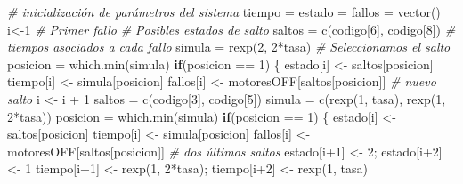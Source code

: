 \documentclass[
]{book}
\newenvironment{Shaded}{\begin{snugshade}}{\end{snugshade}}
\newcommand{\CommentTok}[1]{\textcolor[rgb]{0.56,0.35,0.01}{\textit{#1}}}
\newcommand{\ControlFlowTok}[1]{\textcolor[rgb]{0.13,0.29,0.53}{\textbf{#1}}}
\newcommand{\DecValTok}[1]{\textcolor[rgb]{0.00,0.00,0.81}{#1}}
\newcommand{\FunctionTok}[1]{\textcolor[rgb]{0.00,0.00,0.00}{#1}}
\newcommand{\NormalTok}[1]{#1}
\newcommand{\OtherTok}[1]{\textcolor[rgb]{0.56,0.35,0.01}{#1}}
\newcommand{\SpecialCharTok}[1]{\textcolor[rgb]{0.00,0.00,0.00}{#1}}
\theoremstyle{definition}
\theoremstyle{definition}
\theoremstyle{definition}
\theoremstyle{definition}
\theoremstyle{remark}
\begin{document}
\begin{Shaded}
\begin{Highlighting}[]
  \CommentTok{\# inicialización de parámetros del sistema }
\NormalTok{  tiempo }\OtherTok{=}\NormalTok{  estado }\OtherTok{=}\NormalTok{ fallos }\OtherTok{=} \FunctionTok{vector}\NormalTok{()}
\NormalTok{  i}\OtherTok{\textless{}{-}}\DecValTok{1}
  \CommentTok{\# Primer fallo}
  \CommentTok{\# Posibles estados de salto}
\NormalTok{  saltos }\OtherTok{=} \FunctionTok{c}\NormalTok{(codigo[}\DecValTok{6}\NormalTok{], codigo[}\DecValTok{8}\NormalTok{])}
  \CommentTok{\# tiempos asociados a cada fallo}
\NormalTok{  simula }\OtherTok{=} \FunctionTok{rexp}\NormalTok{(}\DecValTok{2}\NormalTok{, }\DecValTok{2}\SpecialCharTok{*}\NormalTok{tasa)}
  \CommentTok{\# Seleccionamos el salto}
\NormalTok{  posicion }\OtherTok{=} \FunctionTok{which.min}\NormalTok{(simula)}
  \ControlFlowTok{if}\NormalTok{(posicion }\SpecialCharTok{==} \DecValTok{1}\NormalTok{)}
\NormalTok{  \{}
\NormalTok{    estado[i] }\OtherTok{\textless{}{-}}\NormalTok{ saltos[posicion]}
\NormalTok{    tiempo[i] }\OtherTok{\textless{}{-}}\NormalTok{ simula[posicion] }
\NormalTok{    fallos[i] }\OtherTok{\textless{}{-}}\NormalTok{ motoresOFF[saltos[posicion]]}
    \CommentTok{\# nuevo salto}
\NormalTok{    i }\OtherTok{\textless{}{-}}\NormalTok{ i }\SpecialCharTok{+} \DecValTok{1}
\NormalTok{    saltos }\OtherTok{=} \FunctionTok{c}\NormalTok{(codigo[}\DecValTok{3}\NormalTok{], codigo[}\DecValTok{5}\NormalTok{])}
\NormalTok{    simula }\OtherTok{=} \FunctionTok{c}\NormalTok{(}\FunctionTok{rexp}\NormalTok{(}\DecValTok{1}\NormalTok{, tasa), }\FunctionTok{rexp}\NormalTok{(}\DecValTok{1}\NormalTok{, }\DecValTok{2}\SpecialCharTok{*}\NormalTok{tasa))}
\NormalTok{    posicion }\OtherTok{=} \FunctionTok{which.min}\NormalTok{(simula)}
    \ControlFlowTok{if}\NormalTok{(posicion }\SpecialCharTok{==} \DecValTok{1}\NormalTok{)}
\NormalTok{    \{}
\NormalTok{      estado[i] }\OtherTok{\textless{}{-}}\NormalTok{ saltos[posicion]}
\NormalTok{      tiempo[i] }\OtherTok{\textless{}{-}}\NormalTok{ simula[posicion] }
\NormalTok{      fallos[i] }\OtherTok{\textless{}{-}}\NormalTok{ motoresOFF[saltos[posicion]]}
      \CommentTok{\# dos últimos saltos}
\NormalTok{      estado[i}\SpecialCharTok{+}\DecValTok{1}\NormalTok{] }\OtherTok{\textless{}{-}} \DecValTok{2}\NormalTok{; estado[i}\SpecialCharTok{+}\DecValTok{2}\NormalTok{] }\OtherTok{\textless{}{-}} \DecValTok{1}
\NormalTok{      tiempo[i}\SpecialCharTok{+}\DecValTok{1}\NormalTok{] }\OtherTok{\textless{}{-}} \FunctionTok{rexp}\NormalTok{(}\DecValTok{1}\NormalTok{, }\DecValTok{2}\SpecialCharTok{*}\NormalTok{tasa); tiempo[i}\SpecialCharTok{+}\DecValTok{2}\NormalTok{] }\OtherTok{\textless{}{-}} \FunctionTok{rexp}\NormalTok{(}\DecValTok{1}\NormalTok{, tasa)}

\end{Highlighting}
\end{Shaded}
\end{document}
